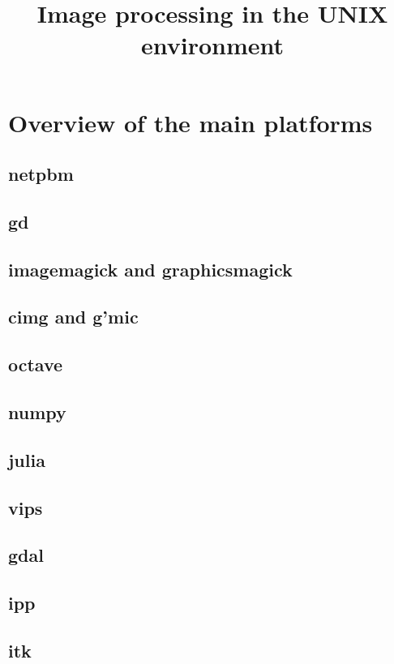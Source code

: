 \title{Image processing in the UNIX environment}

\section{Overview of the main platforms}

\subsection{netpbm}

\subsection{gd}

\subsection{imagemagick and graphicsmagick}

\subsection{cimg and g'mic}

\subsection{octave}

\subsection{numpy}

\subsection{julia}

\subsection{vips}

\subsection{gdal}

\subsection{ipp}

\subsection{itk}

